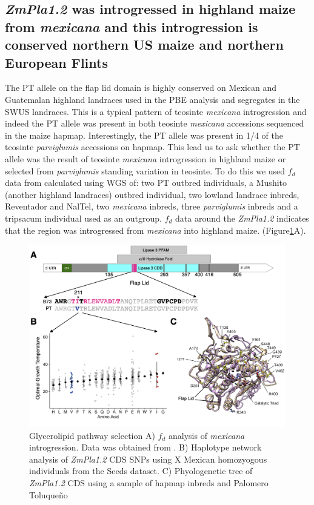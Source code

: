 \documentclass[9pt,twocolumn,twoside,lineno]{gsajnl}
\begin{document}
\subsection{\textit{ZmPla1.2} was introgressed in highland maize from \textit{mexicana} and this introgression is conserved northern US maize and northern European Flints}
The PT allele on the flap lid domain is highly conserved on Mexican and Guatemalan highland landraces used in the PBE analysis and segregates in the SWUS landraces. 
This is a typical pattern of teosinte \textit{mexicana} introgression \cite{Wang2020-mp} and indeed the PT allele was present in both teosinte \textit{mexicana} accessions sequenced in the maize hapmap. Interestingly, the PT allele was present in 1/4 of the teosinte \textit{parviglumis} accessions on hapmap. 
This lead us to ask whether the PT allele was the result of teosinte \textit{mexicana} introgression in highland maize or selected from \textit{parviglumis} standing variation in teosinte. To do this we used \(f_d\) data from \cite{Gonzalez-Segovia2019-jy} calculated using WGS of: two PT outbred individuals, a Mushito (another highland landraces) outbred individual, two lowland landrace inbreds, Reventador and NalTel, two \textit{mexicana} inbreds, three \textit{parviglumis} inbreds and a tripsacum individual used as an outgroup. 
\(f_d\) data around the \textit{ZmPla1.2} indicates that the region was introgressed from \textit{mexicana} into highland maize. (Figure\ref{Fig4}A).
\begin{figure}[!ht]
\begin{center}
\includegraphics[width=0.41\paperwidth]{Figures/Fig_4.png}
\caption{Glycerolipid pathway selection 
A) \(f_d\) analysis of \textit{mexicana} introgression. Data was obtained from \cite{Gonzalez-Segovia2019-jy}. 
B) Haplotype network analysis of \textit{ZmPla1.2} CDS SNPs using X Mexican homozyogous individuals from the Seeds dataset.
C) Phyologenetic tree of \textit{ZmPla1.2} CDS using a sample of hapmap inbreds and Palomero Toluqueño} 
\label{Fig4}
\end{center}
\end{figure} 
\end{document}

